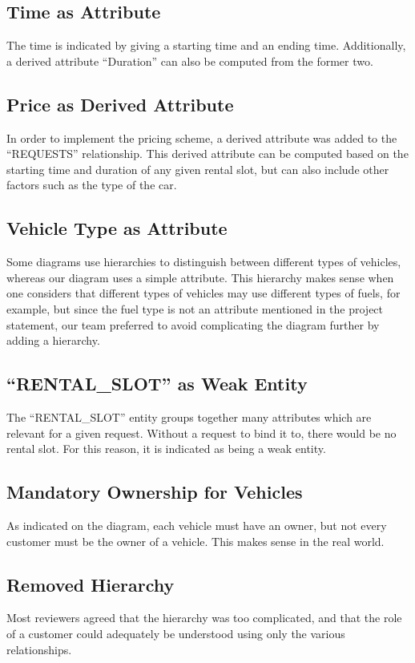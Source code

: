 \documentclass[journal, 9pt]{IEEEtran}
\theoremstyle{definition}
\begin{document}
\subsection{Time as Attribute}
The time is indicated by giving a starting time and an ending time.
Additionally, a derived attribute ``Duration'' can also be computed from the former two.

\subsection{Price as Derived Attribute}
In order to implement the pricing scheme, a derived attribute was added to the ``REQUESTS'' relationship.
This derived attribute can be computed based on the starting time and duration of any given rental slot, but can also include other factors such as the type of the car.

\subsection{Vehicle Type as Attribute}
Some diagrams use hierarchies to distinguish between different types of vehicles, whereas our diagram uses a simple attribute.
This hierarchy makes sense when one considers that different types of vehicles may use different types of fuels, for example, but since the fuel type is not an attribute mentioned in the project statement, our team preferred to avoid complicating the diagram further by adding a hierarchy.

\subsection{``RENTAL\_SLOT'' as Weak Entity}
The ``RENTAL\_SLOT'' entity groups together many attributes which are relevant for a given request.
Without a request to bind it to, there would be no rental slot.
For this reason, it is indicated as being a weak entity.

\subsection{Mandatory Ownership for Vehicles}
As indicated on the diagram, each vehicle must have an owner, but not every customer must be the owner of a vehicle.
This makes sense in the real world.

\subsection{Removed Hierarchy}
Most reviewers agreed that the hierarchy was too complicated, and that the role of a customer could adequately be understood using only the various relationships.
\end{document}
